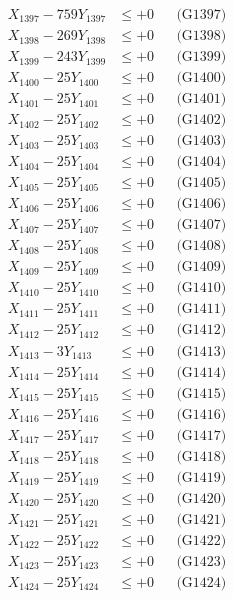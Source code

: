 \documentclass[a4paper,10pt]{article}
\begin{document}
{\begin{align}
X_{1397} - 759Y_{1397} &\leq +0 && \text{(G1397)} \\
X_{1398} - 269Y_{1398} &\leq +0 && \text{(G1398)} \\
X_{1399} - 243Y_{1399} &\leq +0 && \text{(G1399)} \\
X_{1400} - 25Y_{1400} &\leq +0 && \text{(G1400)} \\
\allowbreak
X_{1401} - 25Y_{1401} &\leq +0 && \text{(G1401)} \\
X_{1402} - 25Y_{1402} &\leq +0 && \text{(G1402)} \\
X_{1403} - 25Y_{1403} &\leq +0 && \text{(G1403)} \\
X_{1404} - 25Y_{1404} &\leq +0 && \text{(G1404)} \\
X_{1405} - 25Y_{1405} &\leq +0 && \text{(G1405)} \\
X_{1406} - 25Y_{1406} &\leq +0 && \text{(G1406)} \\
X_{1407} - 25Y_{1407} &\leq +0 && \text{(G1407)} \\
X_{1408} - 25Y_{1408} &\leq +0 && \text{(G1408)} \\
X_{1409} - 25Y_{1409} &\leq +0 && \text{(G1409)} \\
X_{1410} - 25Y_{1410} &\leq +0 && \text{(G1410)} \\
\allowbreak
X_{1411} - 25Y_{1411} &\leq +0 && \text{(G1411)} \\
X_{1412} - 25Y_{1412} &\leq +0 && \text{(G1412)} \\
X_{1413} - 3Y_{1413} &\leq +0 && \text{(G1413)} \\
X_{1414} - 25Y_{1414} &\leq +0 && \text{(G1414)} \\
X_{1415} - 25Y_{1415} &\leq +0 && \text{(G1415)} \\
X_{1416} - 25Y_{1416} &\leq +0 && \text{(G1416)} \\
X_{1417} - 25Y_{1417} &\leq +0 && \text{(G1417)} \\
X_{1418} - 25Y_{1418} &\leq +0 && \text{(G1418)} \\
X_{1419} - 25Y_{1419} &\leq +0 && \text{(G1419)} \\
X_{1420} - 25Y_{1420} &\leq +0 && \text{(G1420)} \\
\allowbreak
X_{1421} - 25Y_{1421} &\leq +0 && \text{(G1421)} \\
X_{1422} - 25Y_{1422} &\leq +0 && \text{(G1422)} \\
X_{1423} - 25Y_{1423} &\leq +0 && \text{(G1423)} \\
X_{1424} - 25Y_{1424} &\leq +0 && \text{(G1424)} \\

\end{align}}
\end{document}
